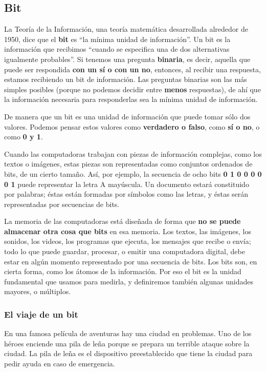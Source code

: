 \documentclass[spanish,A4,]{article}
\begin{document}
\subsection{Bit}\label{bit}

La Teoría de la Información, una teoría matemática desarrollada
alrededor de 1950, dice que el \textbf{bit} es ``la mínima unidad de
información''. Un bit es la información que recibimos ``cuando se
especifica una de dos alternativas igualmente probables''. Si tenemos
una pregunta \textbf{binaria}, es decir, aquella que puede ser
respondida \textbf{con un sí o con un no}, entonces, al recibir una
respuesta, estamos recibiendo un bit de información. Las preguntas
binarias son las más simples posibles (porque no podemos decidir entre
\textbf{menos} respuestas), de ahí que la información necesaria para
responderlas sea la mínima unidad de información.

De manera que un bit es una unidad de información que puede tomar sólo
dos valores. Podemos pensar estos valores como \textbf{verdadero o
falso}, como \textbf{sí o no}, o como \textbf{0 y 1}.

Cuando las computadoras trabajan con piezas de información complejas,
como los textos o imágenes, estas piezas son representadas como
conjuntos ordenados de bits, de un cierto tamaño. Así, por ejemplo, la
secuencia de ocho bits \textbf{0 1 0 0 0 0 0 1} puede representar la letra A
mayúscula. Un documento estará constituido por palabras; éstas están
formadas por símbolos como las letras, y éstas serán representadas por
secuencias de bits.

La memoria de las computadoras está diseñada de forma que \textbf{no se
puede almacenar otra cosa que bits} en esa memoria. Los textos, las
imágenes, los sonidos, los videos, los programas que ejecuta, los
mensajes que recibe o envía; todo lo que puede guardar, procesar, o
emitir una computadora digital, debe estar en algún momento representado
por una secuencia de bits. Los bits son, en cierta forma, como los
átomos de la información. Por eso el bit es la unidad fundamental que
usamos para medirla, y definiremos también algunas unidades mayores, o
múltiplos.

\subsubsection{El viaje de un bit}\label{el-viaje-de-un-bit}

En una famosa película de aventuras hay una ciudad en problemas. Uno de
los héroes enciende una pila de leña porque se prepara un terrible
ataque sobre la ciudad. La pila de leña es el dispositivo preestablecido
que tiene la ciudad para pedir ayuda en caso de emergencia.
\end{document}
